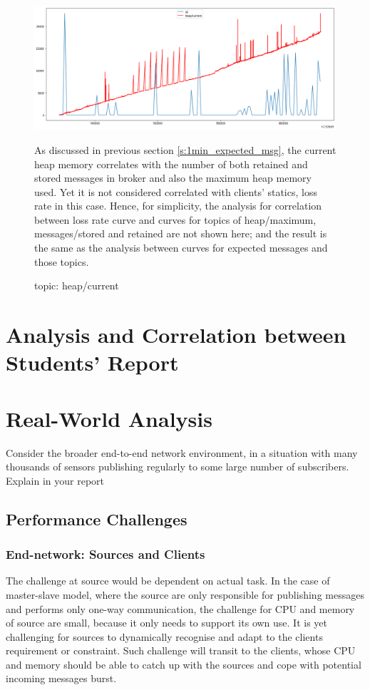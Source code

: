 \documentclass[12pt, letterpaper]{article}
\begin{document}
\begin{figure}
	\setlength{\tabcolsep}{0pt}
	\caption{topic: heap/current}
	\label{f:loss_cnt_heap_current}
	\begin{center}
		\includegraphics[width=\textwidth]{loss_cnt/loss-heap_current}  
	\end{center}
	As discussed in previous section \ref{s:1min_expected_msg}, the current heap memory correlates with the number of both retained and stored messages in broker and also the maximum heap memory used. Yet it is not considered correlated with clients' statics, loss rate in this case. Hence, for simplicity, the analysis for correlation between loss rate curve and curves for topics of heap/maximum, messages/stored and retained are not shown here; and the result is the same as the analysis between curves for expected messages and those topics.
\end{figure}

\FloatBarrier
\section{Analysis and Correlation between Students' Report}


\section{Real-World Analysis}
Consider the broader end-to-end network environment, in a situation with many thousands of
sensors publishing regularly to some large number of subscribers. Explain in your report

\subsection{Performance Challenges}

\subsubsection{End-network: Sources and Clients}
The challenge at source would be dependent on actual task. In the case of master-slave model, where the source are only responsible for publishing messages and performs only one-way communication, the challenge for CPU and memory of source are small, because it only needs to support its own use. It is yet challenging for sources to dynamically recognise and adapt to the clients requirement or constraint. Such challenge will transit to the clients, whose CPU and memory should be able to catch up with the sources and cope with potential incoming messages burst. 
\end{document}
